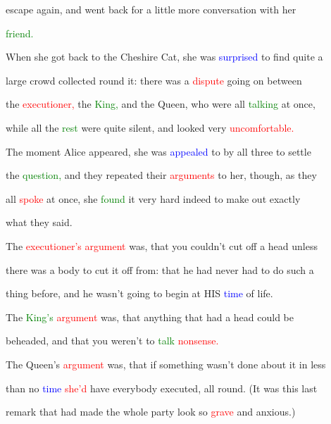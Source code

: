  \textcolor{BurntOrange}{escape} again, and went back for a little more conversation with her

 \textcolor{green}{friend.}



 When she got back to the Cheshire Cat, she was \textcolor{blue}{surprised} to find quite a

 large crowd collected round it: there was a \textcolor{red}{dispute} going on between

 the \textcolor{red}{executioner,} the \textcolor{green}{King,} and the Queen, who were all \textcolor{green}{talking} at once,

 while all the \textcolor{green}{rest} were quite silent, and looked very \textcolor{red}{uncomfortable.}



 The moment Alice appeared, she was \textcolor{blue}{appealed} to by all three to settle

 the \textcolor{green}{question,} and they repeated their \textcolor{red}{arguments} to her, though, as they

 all \textcolor{red}{spoke} at once, she \textcolor{green}{found} it very hard indeed to make out exactly

 what they said.



 The \textcolor{red}{executioner’s} \textcolor{red}{argument} was, that you couldn’t cut off a head unless

 there was a body to cut it off from: that he had never had to do such a

 thing before, and he wasn’t going to begin at HIS \textcolor{blue}{time} of life.



 The \textcolor{green}{King’s} \textcolor{red}{argument} was, that anything that had a head could be

 beheaded, and that you weren’t to \textcolor{green}{talk} \textcolor{red}{nonsense.}



 The Queen’s \textcolor{red}{argument} was, that if something wasn’t done about it in less

 than no \textcolor{blue}{time} \textcolor{red}{she’d} have everybody executed, all round. (It was this last

 remark that had made the whole party look so \textcolor{red}{grave} and \textcolor{BurntOrange}{anxious.)}



